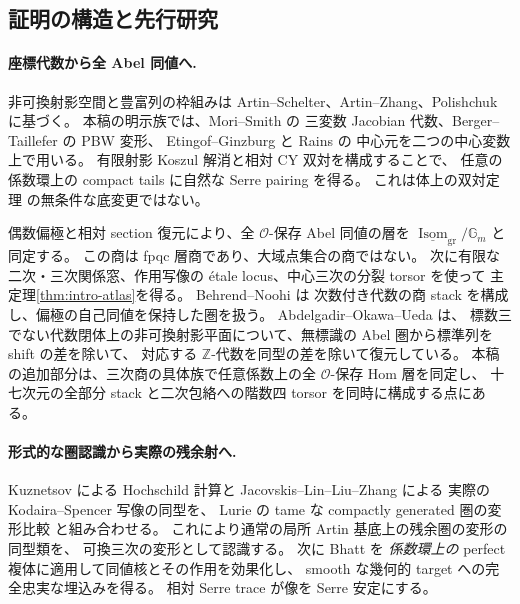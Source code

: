 \documentclass[11pt,a4paper]{ltjsarticle}
\numberwithin{equation}{section}
\begin{document}
\subsection{証明の構造と先行研究}

\paragraph{座標代数から全 Abel 同値へ.}
非可換射影空間と豊富列の枠組みは Artin--Schelter、Artin--Zhang、Polishchuk
\cite{AS,AZ,PolishchukProj}に基づく。
本稿の明示族では、Mori--Smith \cite[Theorem~4.2(1)]{MS} の
三変数 Jacobian 代数、Berger--Taillefer \cite{BT} の PBW 変形、
Etingof--Ginzburg と Rains \cite[Proposition~7.3.1(ii) and \S9.1]{EG} の
中心元を二つの中心変数上で用いる。
有限射影 Koszul 解消と相対 CY 双対を構成することで、
任意の係数環上の compact tails に自然な Serre pairing を得る。
これは体上の双対定理 \cite{YZ,RRGeneralizedAS} の無条件な底変更ではない。

偶数偏極と相対 section 復元により、全 $\mathcal O$-保存 Abel 同値の層を
$\underline{\operatorname{Isom}}_{\mathrm{gr}}/\mathbb G_m$ と同定する。
この商は fpqc 層商であり、大域点集合の商ではない。
次に有限な二次・三次関係窓、作用写像の étale locus、中心三次の分裂 torsor を使って
主定理\ref{thm:intro-atlas}を得る。
Behrend--Noohi \cite[\S\S2.3,2.5,3.1.2]{BehrendNoohiModuli} は
次数付き代数の商 stack を構成し、偏極の自己同値を保持した圏を扱う。
Abdelgadir--Okawa--Ueda \cite[Theorem~7.3, Theorem~A.8 and Corollary~A.10]{AOUNCPlanes} は、
標数三でない代数閉体上の非可換射影平面について、無標識の Abel 圏から標準列を shift の差を除いて、
対応する $\mathbb Z$-代数を同型の差を除いて復元している。
本稿の追加部分は、三次商の具体族で任意係数上の全 $\mathcal O$-保存 Hom 層を同定し、
十七次元の全部分 stack と二次包絡への階数四 torsor を同時に構成する点にある。

\paragraph{形式的な圏認識から実際の残余射へ.}
Kuznetsov \cite[Theorem~8.9]{KuznetsovHochschild} による Hochschild 計算と
Jacovskis--Lin--Liu--Zhang \cite[Theorem~4.4(2)]{JLLZInfinitesimal} による
実際の Kodaira--Spencer 写像の同型を、
Lurie の tame な compactly generated 圏の変形比較
\cite[Theorems~5.1.9,5.3.16 and Proposition~5.3.21]{LurieDAGX}と組み合わせる。
これにより通常の局所 Artin 基底上の残余圏の変形の同型類を、
可換三次の変形として認識する。
次に Bhatt \cite[Lemma~4.2]{BhattAlgebraization} を
\emph{係数環上の} perfect 複体に適用して同値核とその作用を効果化し、
smooth な幾何的 target への完全忠実な埋込みを得る。
相対 Serre trace が像を Serre 安定にする。
\end{document}
